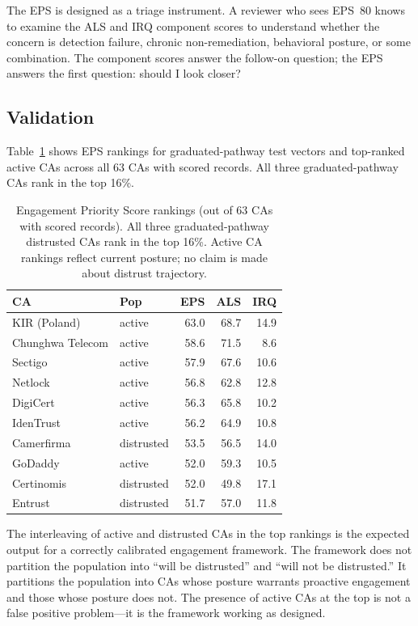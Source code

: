 \documentclass[10pt,twocolumn,letterpaper]{article}
\begin{document}
The EPS is designed as a triage instrument. A reviewer who sees EPS~80 knows to examine
the ALS and IRQ component scores to understand whether the concern is detection failure,
chronic non-remediation, behavioral posture, or some combination. The component scores
answer the follow-on question; the EPS answers the first question: should I look closer?

\subsection{Validation}

Table~\ref{tab:eps} shows EPS rankings for graduated-pathway test vectors and top-ranked
active CAs across all 63 CAs with scored records. All three graduated-pathway CAs rank in
the top 16\%.

\begin{table}[t]
\centering
\footnotesize
\setlength{\tabcolsep}{3pt}
\caption{Engagement Priority Score rankings (out of 63 CAs with scored records). All three
graduated-pathway distrusted CAs rank in the top 16\%. Active CA rankings reflect current
posture; no claim is made about distrust trajectory.}
\label{tab:eps}
\begin{tabularx}{\columnwidth}{@{}Xlrrr@{}}
\toprule
CA & Pop & EPS & ALS & IRQ \\
\midrule
KIR (Poland)     & active     & 63.0 & 68.7 & 14.9 \\
Chunghwa Telecom & active     & 58.6 & 71.5 &  8.6 \\
Sectigo          & active     & 57.9 & 67.6 & 10.6 \\
Netlock          & active     & 56.8 & 62.8 & 12.8 \\
DigiCert         & active     & 56.3 & 65.8 & 10.2 \\
IdenTrust        & active     & 56.2 & 64.9 & 10.8 \\
Camerfirma       & distrusted & 53.5 & 56.5 & 14.0 \\
GoDaddy          & active     & 52.0 & 59.3 & 10.5 \\
Certinomis       & distrusted & 52.0 & 49.8 & 17.1 \\
Entrust          & distrusted & 51.7 & 57.0 & 11.8 \\
\bottomrule
\end{tabularx}
\end{table}

The interleaving of active and distrusted CAs in the top rankings is the expected output
for a correctly calibrated engagement framework. The framework does not partition the
population into ``will be distrusted'' and ``will not be distrusted.'' It partitions
the population into CAs whose posture warrants proactive engagement and those whose
posture does not. The presence of active CAs at the top is not a false positive
problem---it is the framework working as designed.
\end{document}

